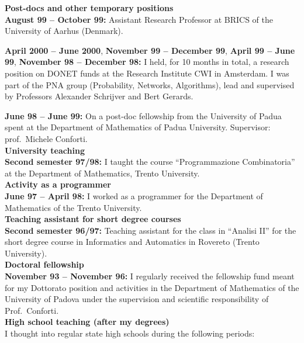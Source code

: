 \documentclass[10pt]{article}
\newcommand{\subvoice}[1] { {\large \bf #1} \smallskip\\ }
\begin{document}
\subvoice{Post-docs and other temporary positions}
{\bf August 99 -- October 99:}
     Assistant Research Professor at BRICS
     of the University of Aarhus (Denmark). 

\noindent
{\bf April 2000 -- June 2000},
{\bf November 99 -- December 99},
{\bf April 99 -- June 99},
{\bf November 98 -- December 98:}
      I held, for 10 months in total,
      a research position on DONET funds
      at the Research Institute CWI in Amsterdam.
      I was part of the PNA group (Probability, Networks, Algorithms),
      lead and supervised by Professors Alexander Schrijver
      and Bert Gerards.

\noindent
{\bf June 98 -- June 99:}
On a post-doc fellowship
from the University of Padua
spent at the Department of Mathematics
of Padua University.
Supervisor: prof.~Michele Conforti.\\

\subvoice{University teaching}
{\bf Second semester 97/98:}
I taught the course ``Programmazione Combinatoria''
at the Department of Mathematics, Trento University.\\

\subvoice{Activity as a programmer}
{\bf June 97 -- April 98:}
I worked as a programmer
for the Department of Mathematics of the Trento University.\\

\subvoice{Teaching assistant for short degree courses}
{\bf Second semester 96/97:}
Teaching assistant for the class in ``Analisi II''
for the short degree course in Informatics and Automatics
in Rovereto (Trento University).\\

\subvoice{Doctoral fellowship}
{\bf November 93 -- November 96:}
I regularly received the fellowship fund
meant for my Dottorato position and activities
in the Department of Mathematics
of the University of Padova 
under the supervision
and scientific responsibility of Prof.~Conforti.\\

\subvoice{High school teaching (after my degrees)}
I thought into regular state high schools
during the following periods:\\
\end{document}
